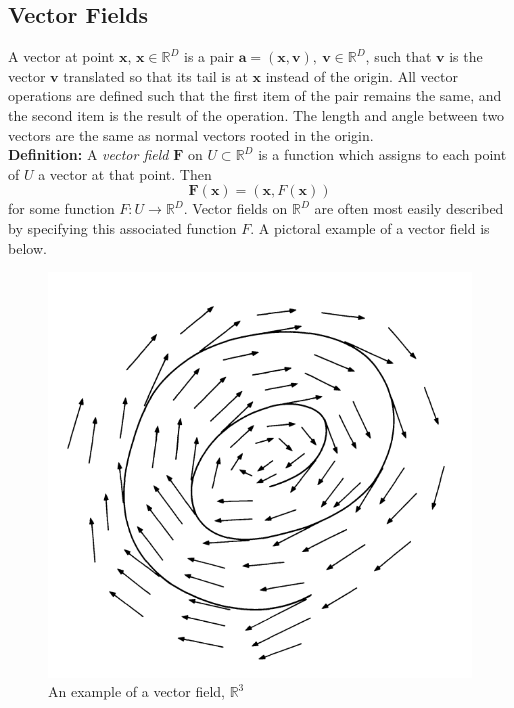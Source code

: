 \documentclass[12pt]{report}
\begin{document}
\subsection{Vector Fields}
A vector at point $\mathbf{x}$, $\mathbf{x} \in \mathbb{R}^{D}$ is a pair 
$\mathbf{a} = (\mathbf{x}, \mathbf{v}), \ \mathbf{v} \in \mathbb{R}^{D}$, 
such that $\mathbf{v}$ is the vector $\mathbf{v}$ translated 
so that its tail is at $\mathbf{x}$ instead of the origin. 
All vector operations are defined such that the first item of the pair remains the same, 
and the second item is the result of the operation. 
The length and angle between two vectors are the same 
as normal vectors rooted in the origin.\\
\textbf{Definition:} A \textit{vector field} $\mathbf{F}$ on 
$U \subset \mathbb{R}^{D}$ is a function which assigns to each point
of $U$ a vector at that point. Then
$$\mathbf{F}(\mathbf{x}) = (\mathbf{x}, F(\mathbf{x}))$$ for some function 
$F: U \longrightarrow \mathbb{R}^{D}$. Vector fields on 
$\mathbb{R}^{D}$ are often most easily described by 
specifying this associated function $F$.
A pictoral example of a vector field is below.
\begin{figure}[h]
    \begin{center}
        \includegraphics[scale=0.5]{fig2.5.PNG}
        \caption{An example of a vector field, $\mathbb{R}^3$}
        \label{fig:vectorfield}
    \end{center}
\end{figure}
\end{document}
